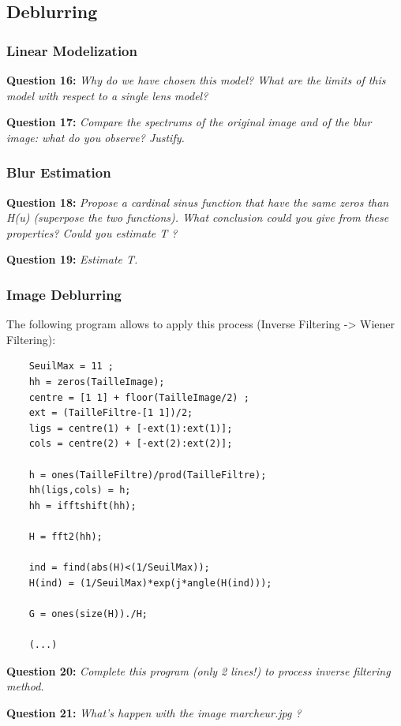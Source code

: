\subsection{Deblurring}
\subsubsection{Linear Modelization}
\textbf{Question 16:}
\textit{Why do we have chosen this model? What are the limits of this model with respect to a single lens model?}



\textbf{Question 17:}
\textit{Compare the spectrums of the original image and of the blur image: what do you observe? Justify.}



\subsubsection{Blur Estimation}
\textbf{Question 18:}
\textit{Propose a cardinal sinus function that have the same zeros than H(u) (superpose the two functions). What conclusion could you give from these properties? Could you estimate T ?}


\textbf{Question 19:}
\textit{Estimate T.}




\subsubsection{Image Deblurring}

The following program allows to apply this process (Inverse Filtering -> Wiener Filtering):
\begin{lstlisting}
    SeuilMax = 11 ;
    hh = zeros(TailleImage);
    centre = [1 1] + floor(TailleImage/2) ;
    ext = (TailleFiltre-[1 1])/2;
    ligs = centre(1) + [-ext(1):ext(1)];
    cols = centre(2) + [-ext(2):ext(2)];
    
    h = ones(TailleFiltre)/prod(TailleFiltre);
    hh(ligs,cols) = h;
    hh = ifftshift(hh);
    
    H = fft2(hh);
    
    ind = find(abs(H)<(1/SeuilMax));
    H(ind) = (1/SeuilMax)*exp(j*angle(H(ind)));
    
    G = ones(size(H))./H;
    
    (...)
\end{lstlisting}


\textbf{Question 20:}
\textit{Complete this program (only 2 lines!) to process inverse ﬁltering method.}



\textbf{Question 21:}
\textit{What’s happen with the image marcheur.jpg ?}